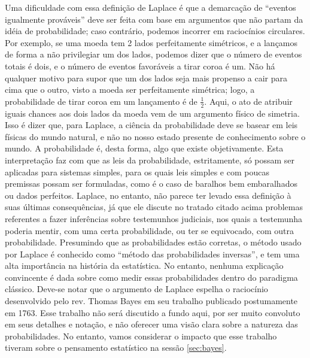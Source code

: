 Uma dificuldade com essa definição de Laplace é que a demarcação de ``eventos igualmente prováveis'' deve ser feita
com base em argumentos que não partam da idéia de probabilidade; caso contrário, podemos incorrer em raciocínios
circulares. Por exemplo, se uma moeda tem 2 lados perfeitamente simétricos, e a lançamos de forma a não privilegiar um dos lados,
podemos dizer que o número de eventos totais é dois, e o número de eventos favoráveis a tirar coroa é um. Não há qualquer motivo
para supor que um dos lados seja mais propenso a cair para cima que o outro, visto a moeda ser perfeitamente simétrica; logo,
a probabilidade de tirar coroa em um lançamento é de $\frac{1}{2}$. Aqui, o ato de atribuir iguais chances aos dois
lados da moeda vem de um argumento físico de simetria. Isso é dizer que, para Laplace,
a ciência da probabilidade deve se basear em leis físicas do mundo natural, e não no nosso estado presente de conhecimento 
sobre o mundo. A probabilidade é, desta forma, algo que existe objetivamente.
Esta interpretação faz com que as leis da probabilidade, estritamente, só possam ser aplicadas para 
sistemas simples, para os quais leis simples e com poucas premissas possam ser formuladas,
como é o caso de baralhos bem embaralhados ou dados perfeitos.
Laplace, no entanto, não parece ter levado essa 
definição à suas últimas consequências, já que ele discute no tratado citado acima problemas referentes a fazer inferências 
sobre testemunhos judiciais, nos 
quais a testemunha poderia mentir, com uma certa probabilidade, ou ter se equivocado, com outra probabilidade. 
Presumindo que as probabilidades estão corretas, o método usado por Laplace é conhecido como ``método das probabilidades
inversas'', e tem uma alta importância na história da estatística.  No entanto, 
nenhuma explicação convincente é dada sobre como medir essas probabilidades dentro do paradigma clássico.
Deve-se notar que o argumento de Laplace espelha o raciocínio desenvolvido pelo rev. Thomas Bayes em seu trabalho publicado
postumamente em 1763. Esse trabalho não será discutido a fundo aqui, por ser muito convoluto em seus detalhes e notação,
e não oferecer uma visão clara sobre a natureza das probabilidades. No entanto, vamos considerar o impacto que esse trabalho
tiveram sobre o pensamento estatístico na sessão \ref{sec:bayes}.


